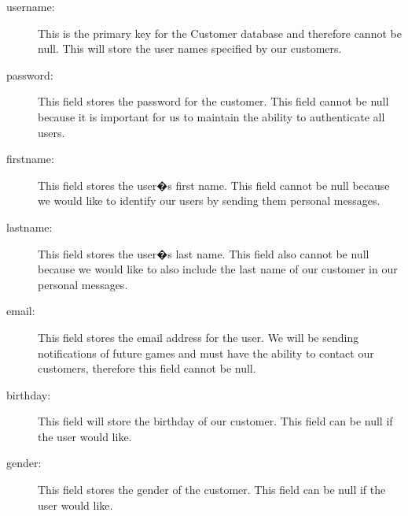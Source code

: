 \begin{description}
    \item[username:] This is the primary key for the Customer database and therefore cannot be null. This will store the user names specified by our customers.
    \item[password:] This field stores the password for the customer. This field cannot be null because it is important for us to maintain the ability to authenticate all users.
    \item[firstname:] This field stores the user�s first name. This field cannot be null because we would like to identify our users by sending them personal messages.
    \item[lastname:] This field stores the user�s last name. This field also cannot be null because we would like to also include the last name of our customer in our personal messages.
    \item[email:] This field stores the email address for the user. We will be sending notifications of future games and must have the ability to contact our customers, therefore this field cannot be null.
	\item[birthday:] This field will store the birthday of our customer. This field can be null if the user would like.
	\item[gender:] This field stores the gender of the customer. This field can be null if the user would like.
\end{description}

